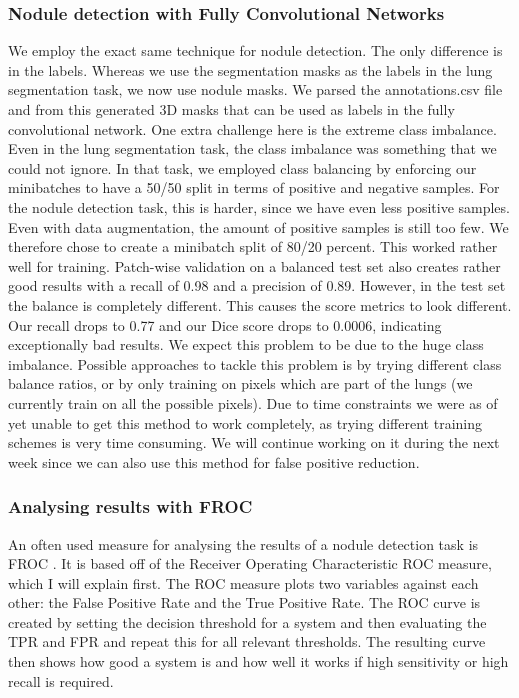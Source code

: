 \documentclass{article}
\begin{document}
\subsubsection{Nodule detection with Fully Convolutional Networks}
\label{sec:fcn}
We employ the exact same technique for nodule detection. The only difference is in the labels. Whereas we use the segmentation masks as the labels in the lung segmentation task, we now use nodule masks. We parsed the annotations.csv file and from this generated 3D masks that can be used as labels in the fully convolutional network. One extra challenge here is the extreme class imbalance. Even in the lung segmentation task, the class imbalance was something that we could not ignore. In that task, we employed class balancing by enforcing our minibatches to have a 50/50 split in terms of positive and negative samples. For the nodule detection task, this is harder, since we have even less positive samples. Even with data augmentation, the amount of positive samples is still too few. We therefore chose to create a minibatch split of 80/20 percent. This worked rather well for training. Patch-wise validation on a balanced test set also creates rather good results with a recall of 0.98 and a precision of 0.89. However, in the test set the balance is completely different. This causes the score metrics to look different. Our recall drops to 0.77 and our Dice score drops to 0.0006, indicating exceptionally bad results. We expect this problem to be due to the huge class imbalance. Possible approaches to tackle this problem is by trying different class balance ratios, or by only training on pixels which are part of the lungs (we currently train on all the possible pixels). Due to time constraints we were as of yet unable to get this method to work completely, as trying different training schemes is very time consuming. We will continue working on it during the next week since we can also use this method for false positive reduction. 

\subsubsection{Analysing results with FROC}
An often used measure for analysing the results of a nodule detection task is FROC \cite{froc}. It is based off of the Receiver Operating Characteristic ROC measure, which I will explain first. The ROC measure  plots two variables against each other: the False Positive Rate and the True Positive Rate. The ROC curve is created by setting the decision threshold for a system and then evaluating the TPR and FPR and repeat this for all relevant thresholds. The resulting curve then shows how good a system is and how well it works if high sensitivity or high recall is required.
\end{document}
